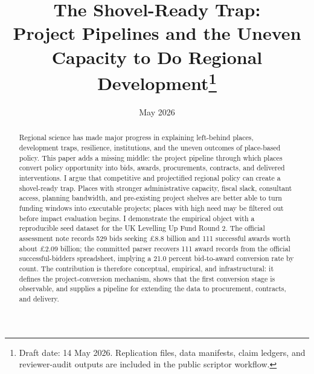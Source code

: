 \documentclass[11pt]{article}
\title{The Shovel-Ready Trap:\\ \large Project Pipelines and the Uneven Capacity to Do Regional Development\thanks{Draft date: 14 May 2026. Replication files, data manifests, claim ledgers, and reviewer-audit outputs are included in the public scriptor workflow.}}
\author{}
\date{May 2026}
\begin{document}
\maketitle

\begin{abstract}
Regional science has made major progress in explaining left-behind places, development traps, resilience, institutions, and the uneven outcomes of place-based policy. This paper adds a missing middle: the project pipeline through which places convert policy opportunity into bids, awards, procurements, contracts, and delivered interventions. I argue that competitive and projectified regional policy can create a shovel-ready trap. Places with stronger administrative capacity, fiscal slack, consultant access, planning bandwidth, and pre-existing project shelves are better able to turn funding windows into executable projects; places with high need may be filtered out before impact evaluation begins. I demonstrate the empirical object with a reproducible seed dataset for the UK Levelling Up Fund Round 2. The official assessment note records 529 bids seeking \pounds8.8 billion and 111 successful awards worth about \pounds2.09 billion; the committed parser recovers 111 award records from the official successful-bidders spreadsheet, implying a 21.0 percent bid-to-award conversion rate by count. The contribution is therefore conceptual, empirical, and infrastructural: it defines the project-conversion mechanism, shows that the first conversion stage is observable, and supplies a pipeline for extending the data to procurement, contracts, and delivery.
\end{abstract}











\pagebreak


\end{document}
